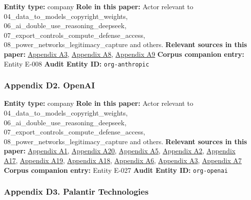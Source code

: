 \documentclass[
  american,
  11pt,
  letterpaper,
]{article}
\begin{document}
\textbf{Entity type:} company \textbf{Role in this paper:} Actor
relevant to 04\_data\_to\_models\_copyright\_weights,
06\_ai\_double\_use\_reasoning\_deepseek,
07\_export\_controls\_compute\_defense\_access,
08\_power\_networks\_legitimacy\_capture and others. \textbf{Relevant
sources in this paper:}
\hyperref[ch-08-appendix-a3-anthropic-outspends-openai-in-biggest-ever-lobbying-quarter]{Appendix
A3},
\hyperref[ch-08-appendix-a8-claude-gov-models-for-u-s-national-security-customers]{Appendix
A8},
\hyperref[ch-08-appendix-a9-anthropic-and-palantir-partner-to-bring-claude-ai-models-to-aws-for-u-s-government-intelligence-and-defense-operations]{Appendix
A9} \textbf{Corpus companion entry:} Entity E-008 \textbf{Audit Entity
ID:} \texttt{org-anthropic}

\subsubsection{Appendix D2. OpenAI}\label{ch-08-appendix-d2-openai}

\textbf{Entity type:} company \textbf{Role in this paper:} Actor
relevant to 04\_data\_to\_models\_copyright\_weights,
06\_ai\_double\_use\_reasoning\_deepseek,
07\_export\_controls\_compute\_defense\_access,
08\_power\_networks\_legitimacy\_capture and others. \textbf{Relevant
sources in this paper:}
\hyperref[ch-08-appendix-a1-openai-announces-leadership-transition]{Appendix
A1},
\hyperref[ch-08-appendix-a20-openais-proposals-for-the-us-ai-action-plan]{Appendix
A20},
\hyperref[ch-08-appendix-a5-openai-board-forms-safety-and-security-committee]{Appendix
A5},
\hyperref[ch-08-appendix-a2-openai-appoints-former-top-us-cyberwarrior-paul-nakasone-to-its-board-of-directors]{Appendix
A2}, \hyperref[ch-08-appendix-a17-musk-v-altman-4-24-cv-04722]{Appendix
A17},
\hyperref[ch-08-appendix-a19-judge-denies-elon-musks-attempt-to-immediately-block-openais-conversion-to-for-profit-entity]{Appendix
A19},
\hyperref[ch-08-appendix-a18-judge-denies-elon-musk-s-request-to-block-openai-for-profit-conversion-but-welcomes-trial]{Appendix
A18},
\hyperref[ch-08-appendix-a6-openai-appoints-one-of-wall-street-s-most-powerful-dealmakers-to-its-board]{Appendix
A6},
\hyperref[ch-08-appendix-a3-anthropic-outspends-openai-in-biggest-ever-lobbying-quarter]{Appendix
A3},
\hyperref[ch-08-appendix-a7-introducing-openai-for-government]{Appendix
A7} \textbf{Corpus companion entry:} Entity E-027 \textbf{Audit Entity
ID:} \texttt{org-openai}

\subsubsection{Appendix D3. Palantir
Technologies}\label{ch-08-appendix-d3-palantir-technologies}
\end{document}
